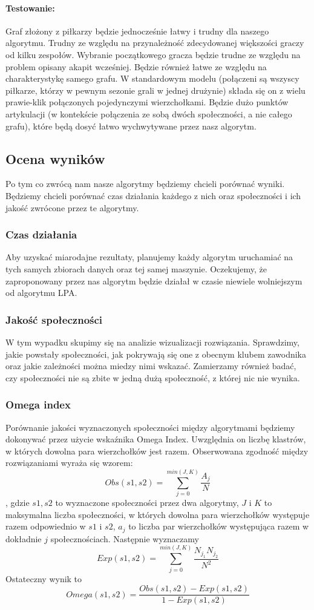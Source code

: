 \documentclass{article}
\begin{document}
\paragraph{Testowanie:} Graf złożony z piłkarzy będzie jednocześnie łatwy i trudny dla naszego algorytmu. Trudny ze względu na przynależność zdecydowanej większości graczy od kilku zespołów. Wybranie początkowego gracza będzie trudne ze względu na problem opisany akapit wcześniej. Będzie również łatwe ze względu na charakterystykę samego grafu. W standardowym modelu (połączeni są wszyscy piłkarze, którzy w pewnym sezonie grali w jednej drużynie) składa się on z wielu prawie-klik połączonych pojedynczymi wierzchołkami. Będzie dużo punktów artykulacji (w kontekście połączenia ze sobą dwóch społeczności, a nie całego grafu), które będą dosyć łatwo wychwytywane przez nasz algorytm.


\subsection{Ocena wyników}
Po tym co zwrócą nam nasze algorytmy będziemy chcieli porównać wyniki. Będziemy chcieli porównać czas działania każdego z nich oraz społeczności i ich jakość zwrócone przez te algorytmy.

\subsubsection{Czas działania}
Aby uzyskać miarodajne rezultaty, planujemy każdy algorytm uruchamiać na
tych samych zbiorach danych oraz tej samej maszynie. Oczekujemy, że zaproponowany przez nas algorytm będzie działał w czasie niewiele wolniejszym od algorytmu LPA.

\subsubsection{Jakość społeczności}
W tym wypadku skupimy się na analizie wizualizacji rozwiązania. Sprawdzimy, jakie powstały społeczności, jak pokrywają się one z obecnym klubem zawodnika oraz jakie zależności można miedzy nimi wskazać. Zamierzamy również badać, czy społeczności nie są zbite w jedną dużą społeczność, z której nic nie wynika.

\subsubsection{Omega index}
Porównanie jakości wyznaczonych społeczności między algorytmami będziemy dokonywać przez użycie wskaźnika Omega Index. Uwzględnia on liczbę klastrów, w których dowolna para wierzchołków jest razem. Obserwowana zgodność między rozwiązaniami wyraża się wzorem: $$Obs(s1,s2) = \sum_{j=0}^{min(J,K)} \frac{A_j}{N} $$, gdzie $s1, s2$ to wyznaczone społeczności przez dwa algorytmy, $J$ i $K$ to maksymalna liczba społeczności, w których dowolna para wierzchołków występuje razem odpowiednio w $s1$ i $s2$, $a_j$ to liczba par wierzchołków występująca razem w dokładnie $j$ społecznościach. Następnie wyznaczamy $$Exp(s1,s2)=\sum_{j=0}^{min(J,K)}\frac{N_{j_1} N_{j_2}}{N^2}$$
Ostateczny wynik to 
$$Omega(s1,s2)=\frac{Obs(s1,s2)-Exp(s1,s2)}{1-Exp(s1,s2)}$$
\end{document}
